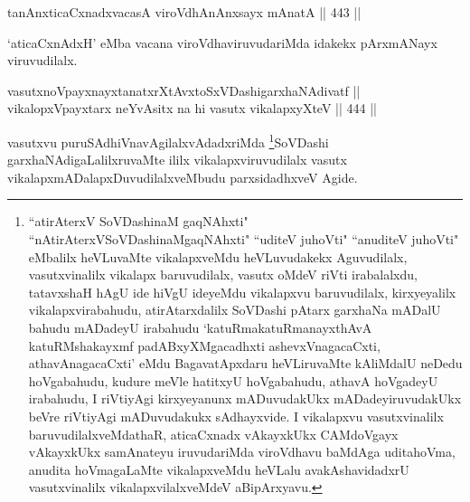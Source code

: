 \begin{shl}
tanAnxticaCxnadxvacasA viroVdhAnAnxsayx mAnatA \hfill || 443 || 
\end{shl}

\begin{artha}
`aticaCxnAdxH' eMba vacana viroVdhaviruvudariMda idakekx pArxmANayx viruvudilalx.
\end{artha}


\begin{shl}
vasutxnoV\s payxnayxtanatxrXtAvxtoSxVDashigarxhaNAdivatf || \\
vikalopxV\s payxtarx neYvAsitx na hi vasutx vikalapxyXteV \hfill || 444 || 
\end{shl}

\begin{artha}
vasutxvu puruSAdhiVnavAgilalxvAdadxriMda \footnote{``atirAterxV SoVDashinaM gaqNAhxti" ``nAtirAterxVSoVDashinaMgaqNAhxti" ``uditeV juhoVti" ``anuditeV juhoVti" eMbalilx heVLuvaMte vikalapxveMdu heVLuvudakekx Aguvudilalx, vasutxvinalilx vikalapx baruvudilalx, vasutx oMdeV riVti irabalalxdu, tatavxshaH hAgU ide hiVgU ideyeMdu vikalapxvu baruvudilalx, kirxyeyalilx vikalapxvirabahudu, atirAtarxdalilx SoVDashi pAtarx garxhaNa mADalU bahudu mADadeyU irabahudu `katuRmakatuRmanayxthAvA katuRMshakayxmf padABxyXMgacadhxti ashevxVnagacaCxti, athavAnagacaCxti' eMdu BagavatApxdaru heVLiruvaMte kAliMdalU neDedu hoVgabahudu, kudure meVle hatitxyU hoVgabahudu, athavA hoVgadeyU irabahudu, I riVtiyAgi kirxyeyanunx mADuvudakUkx mADadeyiruvudakUkx beVre riVtiyAgi mADuvudakukx sAdhayxvide. I vikalapxvu vasutxvinalilx baruvudilalxveMdathaR, aticaCxnadx vAkayxkUkx CAMdoVgayx vAkayxkUkx samAnateyu iruvudariMda viroVdhavu baMdAga uditahoVma, anudita hoVmagaLaMte vikalapxveMdu heVLalu avakAshavidadxrU vasutxvinalilx vikalapxvilalxveMdeV aBipArxyavu.}SoVDashi garxhaNAdigaLalilxruvaMte ililx vikalapxviruvudilalx vasutx vikalapxmADalapxDuvudilalxveMbudu parxsidadhxveV Agide.
\end{artha}



